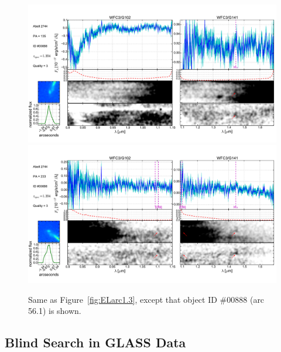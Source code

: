 \begin{figure}
    \centering
    \includegraphics[width=\textwidth]{fig/clA2744_id888_pa135_zsQ3.pdf}\\
    \includegraphics[width=\textwidth]{fig/clA2744_id888_pa233_zsQ3.pdf}
    \caption{Same as Figure~\ref{fig:ELarc1.3}, except that object ID \#00888 (arc 56.1) is shown.}
    \label{fig:ELarc56.1}
\end{figure}


\subsection{Blind Search in GLASS Data}
\label{subsec:blind}

